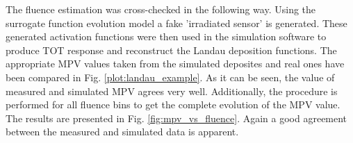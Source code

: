 The fluence estimation was cross-checked in the following way. Using the surrogate function evolution model a fake 'irradiated sensor' is generated. These generated activation functions were then used in the simulation software to produce TOT response and reconstruct the Landau deposition functions. The appropriate MPV values taken from the simulated deposites and real ones have been compared in Fig. \ref{plot:landau_example}. As it can be seen, the value of measured and simulated MPV agrees very well.
Additionally, the procedure is performed for all fluence bins to get the complete evolution of the MPV value.
The results are presented in Fig. \ref{fig:mpv_vs_fluence}. Again a good agreement between the measured and simulated data is apparent.



